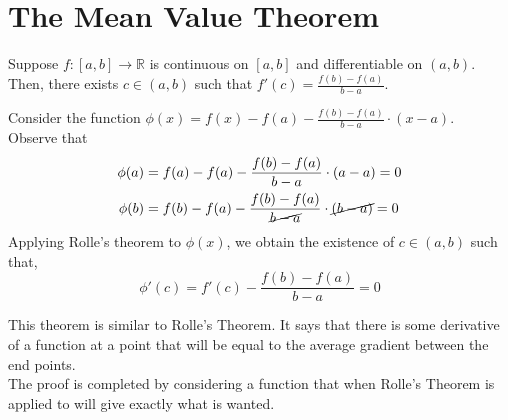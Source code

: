 \documentclass[12pt]{article}
\begin{document}
\section{The Mean Value Theorem}
\begin{theo}{}
    Suppose $f: [a, b] \rightarrow \mathbb R$ is continuous on $[a, b]$ and differentiable on $(a, b)$. Then, there exists $c \in (a, b)$ such that $f'(c) = \frac{f(b) - f(a)}{b- a}$.
\end{theo}
\begin{prf}{}
    Consider the function $\phi(x) = f(x) - f(a) - \frac{f(b) - f(a)}{b - a}\cdot (x - a)$.\\ Observe that\\
\begin{align*}
    \phi(a) &= f(a) - f(a) - \frac{f(b) - f(a)}{b - a}\cdot (a - a) = 0\\
    \phi(b) &= f(b) - f(a) - \frac{f(b) - f(a)}{\cancel{b - a}}\cdot \cancel{(b - a)} = 0
\end{align*}
Applying Rolle's theorem to $\phi(x)$, we obtain the existence of $c \in (a, b)$ such that, \\
  $$\phi'(c) = f'(c) - \frac{f(b) - f(a)}{b - a} = 0$$  
\end{prf}
\begin{explanation}{}
    This theorem is similar to Rolle's Theorem. It says that there is some derivative of a function at a point that will be equal to the average gradient between the end points.\\
    The proof is completed by considering a function that when Rolle's Theorem is applied to will give exactly what is wanted.\\
\end{explanation}
\end{document}

